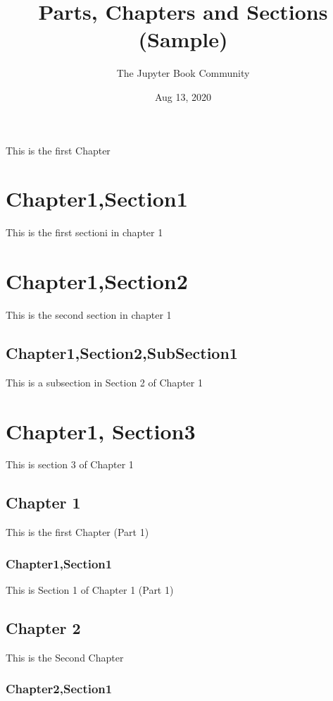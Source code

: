 \documentclass[letterpaper,10pt,english]{sphinxmanual}
\title{Parts, Chapters and Sections (Sample)}
\date{Aug 13, 2020}
\author{The Jupyter Book Community}
\begin{document}
\pagestyle{empty}
\sphinxmaketitle
\pagestyle{plain}
\sphinxtableofcontents
\pagestyle{normal}
\label{\detokenize{intro::doc}}


This is the first Chapter


\chapter{Chapter1,Section1}
\label{\detokenize{intro:chapter1-section1}}
This is the first sectioni in chapter 1


\chapter{Chapter1,Section2}
\label{\detokenize{intro:chapter1-section2}}
This is the second section in chapter 1


\section{Chapter1,Section2,SubSection1}
\label{\detokenize{intro:chapter1-section2-subsection1}}
This is a subsection in Section 2 of Chapter 1


\chapter{Chapter1, Section3}
\label{\detokenize{intro:chapter1-section3}}
This is section 3 of Chapter 1


\section{Chapter 1}
\label{\detokenize{part1/chapter1:chapter-1}}\label{\detokenize{part1/chapter1::doc}}
This is the first Chapter (Part 1)


\subsection{Chapter1,Section1}
\label{\detokenize{part1/chapter1:chapter1-section1}}
This is Section 1 of Chapter 1 (Part 1)


\section{Chapter 2}
\label{\detokenize{part1/chapter2:chapter-2}}\label{\detokenize{part1/chapter2::doc}}
This is the Second Chapter


\subsection{Chapter2,Section1}
\label{\detokenize{part1/chapter2:chapter2-section1}}
\end{document}
